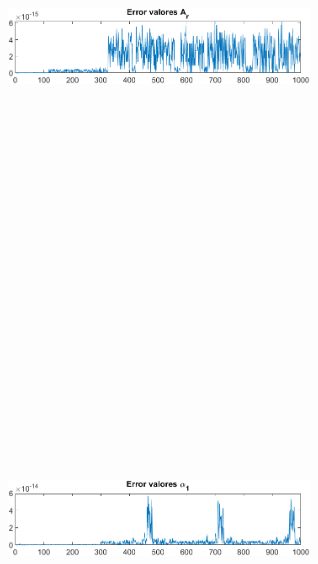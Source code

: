 \documentclass[12pt]{article}
\begin{document}
\begin{figure} [H]
        \centerline{\includegraphics[width=8cm, height=12cm,keepaspectratio]{Error/Error Ar.png}}
    \end{figure}
    \vspace{-25pt}
        \begin{figure} [H]
        \centerline{\includegraphics[width=8cm, height=12cm,keepaspectratio]{Error/Error alpha1.png}}
    \end{figure}
\end{document}
